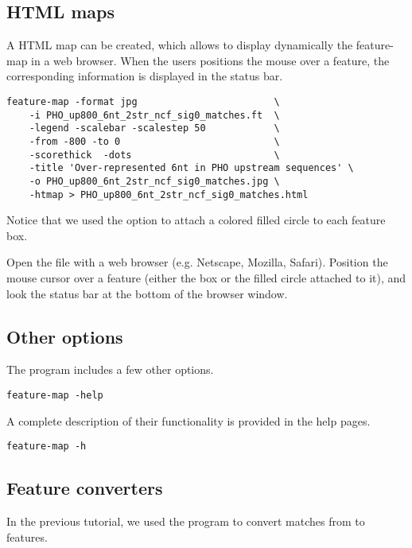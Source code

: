 \subsection{HTML maps}

A HTML map can be created, which allows to display dynamically the
feature-map in a web browser. When the users positions the mouse over
a feature, the corresponding information is displayed in the status
bar.

\begin{verbatim}
feature-map -format jpg                        \
    -i PHO_up800_6nt_2str_ncf_sig0_matches.ft  \
    -legend -scalebar -scalestep 50            \
    -from -800 -to 0                           \
    -scorethick  -dots                         \
    -title 'Over-represented 6nt in PHO upstream sequences' \
    -o PHO_up800_6nt_2str_ncf_sig0_matches.jpg \
    -htmap > PHO_up800_6nt_2str_ncf_sig0_matches.html
\end{verbatim}

Notice that we used the option \option{-dot} to attach a colored filled 
circle to each feature box. 

Open the file 
with a web browser (e.g. Netscape, Mozilla, Safari). Position the
mouse cursor over a feature (either the box or the filled circle
attached to it), and look the status bar at the bottom of the browser
window.

\subsection{Other options}

The program \program{feature-map} includes a few other options.

\begin{verbatim}
feature-map -help
\end{verbatim}

A complete description of their functionality is provided in 
the help pages.

\begin{verbatim}
feature-map -h
\end{verbatim}

\subsection{Feature converters}

In the previous tutorial, we used the program
 to convert matches from
 to features. 

